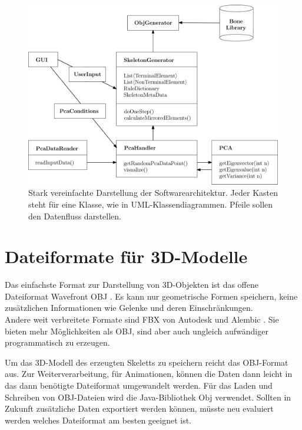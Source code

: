 \begin{figure}[ht]
 \includegraphics[width=\textwidth]{graphics/classDiagram}
 \caption{Stark vereinfachte Darstellung der Softwarearchitektur. Jeder Kasten steht für eine Klasse, wie in UML-Klassendiagrammen. Pfeile sollen den Datenfluss darstellen.}
 \label{classDiagram}
\end{figure}


\section{Dateiformate für 3D-Modelle}

Das einfachste Format zur Darstellung von 3D-Objekten ist das offene Dateiformat Wavefront OBJ \cite{obj}. Es kann nur geometrische Formen speichern, keine zusätzlichen Informationen wie \zb Gelenke und deren Einschränkungen.\\
Andere weit verbreitete Formate sind FBX von Autodesk \cite{fbx} und Alembic \cite{alembic}. Sie bieten mehr Möglichkeiten als OBJ, sind aber auch ungleich aufwändiger programmatisch zu erzeugen.

Um das 3D-Modell des erzeugten Skeletts zu speichern reicht das OBJ-Format aus. Zur Weiterverarbeitung, \zb für Animationen, können die Daten dann leicht in das dann benötigte Dateiformat umgewandelt werden. Für das Laden und Schreiben von OBJ-Dateien wird die Java-Bibliothek Obj \cite{ObjLoader} verwendet.
Sollten in Zukunft zusätzliche Daten exportiert werden können, müsste neu evaluiert werden welches Dateiformat am besten geeignet ist.




